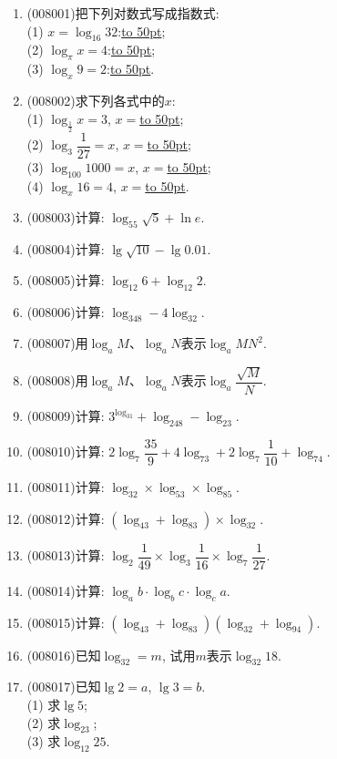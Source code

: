 \documentclass[10pt,a4paper]{article}
\newcommand{\blank}[1]{\underline{\hbox to #1pt{}}}
\begin{document}
\begin{enumerate}[1.]
(2) $(\dfrac 12)^0=1$:\blank{50};\\
(3) $5^x=6$:\blank{50}.
\item {\tiny (008001)}把下列对数式写成指数式:\\
(1) $x=\log _{16}32$:\blank{50};\\
(2) $\log _{\pi }x=4$:\blank{50};\\
(3) $\log _x9=2$:\blank{50}.
\item {\tiny (008002)}求下列各式中的$x$:\\
(1) $\log _{\frac 12}x=3$, $x=$\blank{50};\\
(2) $\log _3\dfrac 1{27}=x$, $x=$\blank{50};\\
(3) $\log _{100}1000=x$, $x=$\blank{50};\\
(4) $\log _x16=4$, $x=$\blank{50}.
\item {\tiny (008003)}计算: $\log _55\sqrt 5+\ln e$.
\item {\tiny (008004)}计算: $\lg \sqrt {10}-\lg 0.01$.
\item {\tiny (008005)}计算: $\log _{12}6+\log _{12}2$.
\item {\tiny (008006)}计算: $\log _348-4\log _32$.
\item {\tiny (008007)}用$\log _aM$、$\log _aN$表示$\log _aMN^2$.
\item {\tiny (008008)}用$\log _aM$、$\log _aN$表示$\log _a\dfrac{\sqrt M}N$.
\item {\tiny (008009)}计算: $3^{\log _31}+\log _248-\log _23$.
\item {\tiny (008010)}计算: $2\log _7\dfrac{35}9+4\log _73+2\log _7\dfrac 1{10}+\log _74$.
\item {\tiny (008011)}计算: $\log _32\times \log _53\times \log _85$.
\item {\tiny (008012)}计算: $(\log _43+\log _83)\times \log _32$.
\item {\tiny (008013)}计算: $\log _2\dfrac 1{49}\times \log _3\dfrac 1{16}\times \log _7\dfrac 1{27}$.
\item {\tiny (008014)}计算: $\log _ab\cdot \log _bc\cdot \log _ca$.
\item {\tiny (008015)}计算: $(\log _43+\log _83)(\log _32+\log _94)$.
\item {\tiny (008016)}已知$\log _32=m$, 试用$m$表示$\log _{32}18$.
\item {\tiny (008017)}已知$\lg 2=a$, $\lg 3=b$.\\
(1) 求$\lg 5$;\\
(2) 求$\log _23$;\\
(3) 求$\log _{12}25$.

\end{enumerate}
\end{document}
